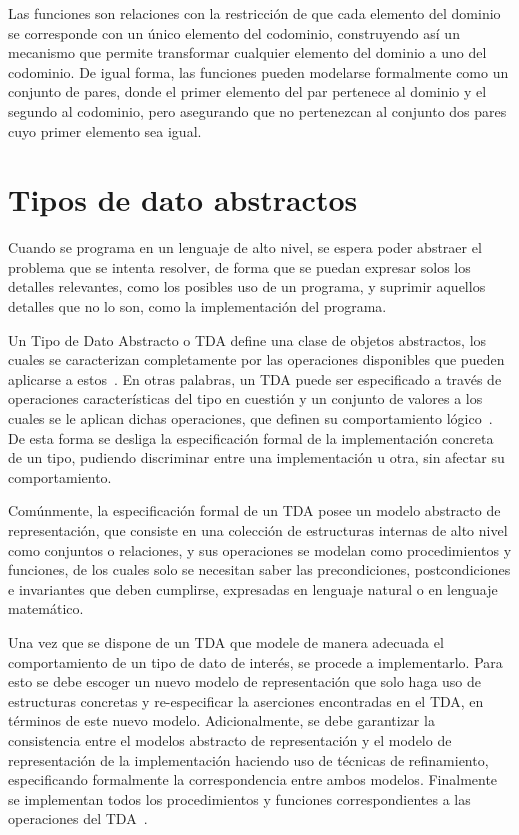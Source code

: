 \begin{description}[leftmargin=!,labelwidth=\widthof{\bfseries Multiconjunto}]
  \item [Función] Las funciones son relaciones con la restricción de que cada
  elemento del dominio se corresponde con un único elemento del codominio,
  construyendo así un mecanismo que permite transformar cualquier elemento del
  dominio a uno del codominio. De igual forma, las funciones pueden modelarse
  formalmente como un conjunto de pares, donde el primer elemento del par
  pertenece al dominio y el segundo al codominio, pero asegurando que no
  pertenezcan al conjunto dos pares cuyo primer elemento sea igual.

\end{description}

\section{Tipos de dato abstractos}

Cuando se programa en un lenguaje de alto nivel, se espera poder abstraer el
problema que se intenta resolver, de forma que se puedan expresar solos los
detalles relevantes, como los posibles uso de un programa, y suprimir aquellos
detalles que no lo son, como la implementación del programa.

Un Tipo de Dato Abstracto o TDA define una clase de objetos abstractos, los
cuales se caracterizan completamente por las operaciones disponibles que pueden
aplicarse a estos~\cite{liskov}. En otras palabras, un TDA puede ser
especificado a través de operaciones características del tipo en cuestión y un
conjunto de valores a los cuales se le aplican dichas operaciones, que definen
su comportamiento lógico~\cite{dalewalker}. De esta forma se desliga la
especificación formal de la implementación concreta de un tipo, pudiendo
discriminar entre una implementación u otra, sin afectar su comportamiento.

Comúnmente, la especificación formal de un TDA posee un modelo abstracto de
representación, que consiste en una colección de estructuras internas de alto
nivel como conjuntos o relaciones, y sus operaciones se modelan como
procedimientos y funciones, de los cuales solo se necesitan saber las
precondiciones, postcondiciones e invariantes que deben cumplirse, expresadas
en lenguaje natural o en lenguaje matemático.

Una vez que se dispone de un TDA que modele de manera adecuada el
comportamiento de un tipo de dato de interés, se procede a implementarlo. Para
esto se debe escoger un nuevo modelo de representación que solo haga uso de
estructuras concretas y re-especificar la aserciones encontradas en el TDA, en
términos de este nuevo modelo. Adicionalmente, se debe garantizar la
consistencia entre el modelos abstracto de representación y el modelo de
representación de la implementación haciendo uso de técnicas de refinamiento,
especificando formalmente la correspondencia entre ambos modelos. Finalmente
se implementan todos los procedimientos y funciones correspondientes a las
operaciones del TDA~\cite{ravelo}.

